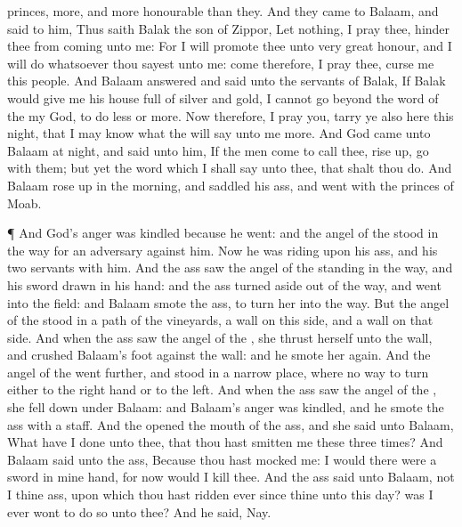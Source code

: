{princes,
more, and more
honourable than they.
And they
came to
Balaam, and
said to him, Thus
saith
Balak the
son of
Zippor, Let nothing, I pray thee,
hinder thee from
coming unto me:
For I will
promote thee unto
very
great
honour, and I will
do whatsoever thou
sayest unto me:
come therefore, I pray thee,
curse me this
people.
And
Balaam
answered and
said unto the
servants of
Balak, If
Balak would
give me his
house
full of
silver and
gold, I
cannot go
beyond the
word of the
{} my
God, to
do
less or
more.
Now therefore, I pray you,
tarry ye also here this
night, that I may
know what the
{} will
say unto me
more.
And
God
came unto
Balaam at
night, and
said unto him, If the
men
come to
call thee, rise
up,
{}
go with them; but
yet the
word which I shall
say unto thee, that shalt thou
do.
And
Balaam rose
up in the
morning, and
saddled his
ass, and
went with the
princes of
Moab.
\par }{\PP {}¶ And
God’s
anger was
kindled because he
went: and the
angel of the
{}
stood in the
way for an
adversary against him. Now he was
riding upon his
ass, and his
two
servants
{} with him.
And the
ass
saw the
angel of the
{}
standing in the
way, and his
sword
drawn in his
hand: and the
ass turned
aside out of the
way, and
went into the
field: and
Balaam
smote the
ass, to
turn her into the
way.
But the
angel of the
{}
stood in a
path of the
vineyards, a
wall
{} on this side, and a
wall on that side.
And when the
ass
saw the
angel of the
{}, she
thrust herself unto the
wall, and
crushed
Balaam’s
foot against the
wall: and he
smote her
again.
And the
angel of the
{}
went
further, and
stood in a
narrow
place, where
{} no
way to
turn either to the right
hand or to the
left.
And when the
ass
saw the
angel of the
{}, she fell
down under
Balaam: and
Balaam’s
anger was
kindled, and he
smote the
ass with a
staff.
And the
{}
opened the
mouth of the
ass, and she
said unto
Balaam, What have I
done unto thee, that thou hast
smitten me these
three
times?
And
Balaam
said unto the
ass, Because thou hast
mocked me: I
would there
were a
sword in mine
hand, for now would I
kill thee.
And the
ass
said unto
Balaam,
{} not I thine
ass, upon which thou hast
ridden ever since
{} thine unto this
day? was I
ever
wont to do
so unto thee? And he
said, Nay.}
